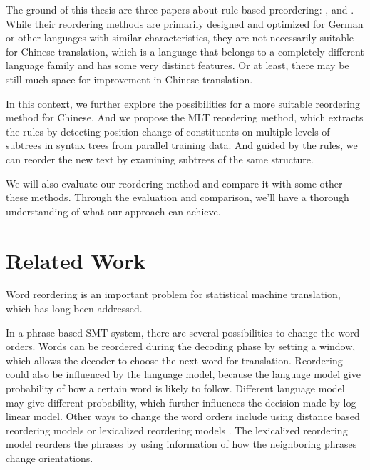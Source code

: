 The ground of this thesis are three papers about rule-based preordering: \cite{short}, \cite{long} and \cite{tree}. While their reordering methods are primarily designed and optimized for German or other languages with similar characteristics, they are not necessarily suitable for Chinese translation, which is a language that belongs to a completely different language family and has some very distinct features. Or at least, there may be still much space for improvement in Chinese translation.

In this context, we further explore the possibilities for a more suitable reordering method for Chinese. And we propose the \ac{MLT} reordering method, which extracts the rules by detecting position change of constituents on multiple levels of subtrees in syntax trees from parallel training data. And guided by the rules, we can reorder the new text by examining subtrees of the same structure.

We will also evaluate our reordering method and compare it with some other these methods. Through the evaluation and comparison, we'll have a thorough understanding of what our approach can achieve.





\section{Related Work}
\label{ch:Introduction:sec:RelatedWork}

Word reordering is an important problem for statistical machine translation, which has long been addressed.

In a phrase-based \ac{SMT} system, there are several possibilities to change the word orders. Words can be reordered during the decoding phase by setting a window, which allows the decoder to choose the next word for translation. Reordering could also be influenced by the language model, because the language model give probability of how a certain word is likely to follow. Different language model may give different probability, which further influences the decision made by log-linear model. Other ways to change the word orders include using distance based reordering models or lexicalized reordering models \citep{tillmann2004, koehn2005}. The lexicalized reordering model reorders the phrases by using information of how the neighboring phrases change orientations.

